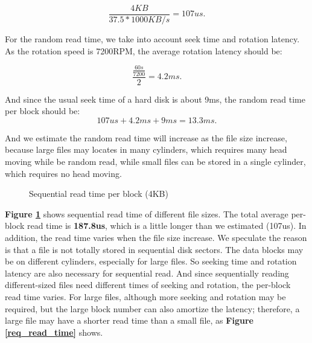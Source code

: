 $$\frac{4KB}{37.5*1000KB/s} = 107us.$$

For the random read time, we take into account seek time and rotation latency. As the rotation speed is 7200RPM, the average rotation latency should be:

$$ \frac{\frac{60s}{7200}}{2} = 4.2ms.$$

And since the usual seek time of a hard disk is about 9ms, the random read time per block should be:
$$ 107us + 4.2ms + 9ms = 13.3ms. $$

And we estimate the random read time will increase as the file size increase, because large files may locates in many cylinders, which requires many head moving while be random read, while small files can be stored in a single cylinder, which requires no head moving.

\begin{figure}[ht]
    \centering
    \caption{Sequential read time per block (4KB)}
    \label{seq_read_time}
\end{figure}

\textbf{Figure \ref{seq_read_time}} shows sequential read time of different file sizes. The total average per-block read time is \textbf{187.8us}, which is a little longer than we estimated (107us). In addition, the read time varies when the file size increase. We speculate the reason is that a file is not totally stored in sequential disk sectors. The data blocks may be on different cylinders, especially for large files. So seeking time and rotation latency are also necessary for
sequential read. And since sequentially reading different-sized files need different times of seeking and rotation, the per-block read time varies. For large files, although more seeking and rotation may be required, but the large block number can also amortize the latency; therefore, a large file may have a shorter read time than a small file, as \textbf{Figure \ref{req_read_time}} shows.


